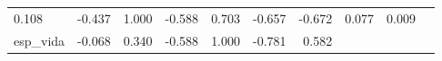 \documentclass[]{article}
\begin{document}
\begin{longtable}[]{@{}lrrrrrrrrr@{}}
\begin{minipage}[t]{0.08\columnwidth}
0.108\strut
\end{minipage} & \begin{minipage}[t]{0.07\columnwidth}\raggedleft\strut
-0.437\strut
\end{minipage} & \begin{minipage}[t]{0.10\columnwidth}\raggedleft\strut
1.000\strut
\end{minipage} & \begin{minipage}[t]{0.07\columnwidth}\raggedleft\strut
-0.588\strut
\end{minipage} & \begin{minipage}[t]{0.05\columnwidth}\raggedleft\strut
0.703\strut
\end{minipage} & \begin{minipage}[t]{0.07\columnwidth}\raggedleft\strut
-0.657\strut
\end{minipage} & \begin{minipage}[t]{0.06\columnwidth}\raggedleft\strut
-0.672\strut
\end{minipage} & \begin{minipage}[t]{0.05\columnwidth}\raggedleft\strut
0.077\strut
\end{minipage} & \begin{minipage}[t]{0.10\columnwidth}\raggedleft\strut
0.009\strut
\end{minipage}\tabularnewline
\begin{minipage}[t]{0.10\columnwidth}\raggedright\strut
esp\_vida\strut
\end{minipage} & \begin{minipage}[t]{0.08\columnwidth}\raggedleft\strut
-0.068\strut
\end{minipage} & \begin{minipage}[t]{0.07\columnwidth}\raggedleft\strut
0.340\strut
\end{minipage} & \begin{minipage}[t]{0.10\columnwidth}\raggedleft\strut
-0.588\strut
\end{minipage} & \begin{minipage}[t]{0.07\columnwidth}\raggedleft\strut
1.000\strut
\end{minipage} & \begin{minipage}[t]{0.05\columnwidth}\raggedleft\strut
-0.781\strut
\end{minipage} & \begin{minipage}[t]{0.07\columnwidth}\raggedleft\strut
0.582\strut
\end{minipage} & \begin{minipage}[t]{0.06\columnwidth}\raggedleft\strut

\end{minipage}
\end{longtable}
\end{document}
